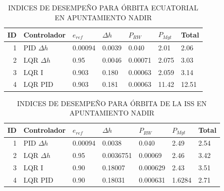 \begin{table}[!h]
	\label{table:nadir_ecuatorial}
	\caption{\MakeUppercase{Indices de desempeño para órbita ecuatorial en apuntamiento Nadir}}
	\centering
	\begin{tabular}{r|lllll|l}
		\multicolumn{1}{l|}{\textbf{ID}} & \textbf{Controlador}                  & \mbox{\boldmath$e_{ref}$}   & \mbox{\boldmath$\Delta h$} & \mbox{\boldmath$P_{RW}$}   & \mbox{\boldmath$P_{Mgt}$}    & \textbf{Total}      \\ 
		\hline
		1                       & PID $\Delta h$ & 0.00094 &0.0039& 0.040& 2.01 &2.06  \\
		2                       & LQR $\Delta h$ & 0.95 & 0.0046& 0.00071& 2.075& 3.03  \\
		3                       & LQR I          & 0.903 &0.180 &0.00063 &2.059 &3.14  \\
		4                       & LQR PID        & 0.903& 0.181 &0.00063 &11.42 &12.51  \\
		\hline
	\end{tabular}
\end{table}


\begin{table}[!h]
	\label{table:nadir_iss}
	\caption{\MakeUppercase{Indices de desempeño para órbita de la ISS en apuntamiento Nadir}}
	\centering
	\begin{tabular}{r|lllll|l}
		\multicolumn{1}{l|}{\textbf{ID}} & \textbf{Controlador}                  & \mbox{\boldmath$e_{ref}$}   & \mbox{\boldmath$\Delta h$} & \mbox{\boldmath$P_{RW}$}   & \mbox{\boldmath$P_{Mgt}$}    & \textbf{Total}      \\ 
		\hline
		1                       & PID $\Delta h$ &0.00094 &0.0038 &0.040 &2.49& 2.54  \\
		2                       & LQR $\Delta h$ & 0.95 &0.0036751& 0.00069 &2.46 &3.42  \\
		3                       & LQR I          & 0.90 &0.18007 &0.000629 &2.43 &3.51 \\
		4                       & LQR PID        & 0.90 &0.18031 &0.000631& 1.6284 &2.71  \\
		\hline
	\end{tabular}
\end{table}


